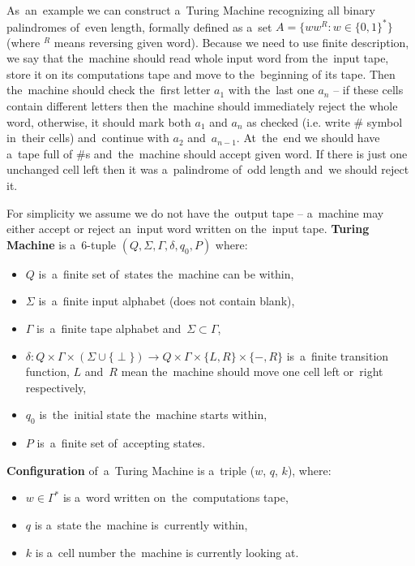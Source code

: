 \documentclass[english,shortabstract,mgr]{iithesis}
\begin{document}
As~an~example we can construct a~Turing Machine recognizing all binary palindromes of~even length,
formally defined as a~set $A = \{ ww^R : w \in \{0,1\}^* \}$ (where $^R$ means reversing given word).
Because we need to use finite description, we say that the~machine should read whole input word
from the~input tape, store it on its computations tape and move to the~beginning of its tape.
Then the~machine should check the~first letter $a_1$ with the~last one $a_n$ -- if these cells
contain different letters then the~machine should immediately reject the whole word,
otherwise, it should mark both $a_1$ and $a_n$ as checked (i.e. write $\#$ symbol in~their cells)
and~continue with $a_2$ and~$a_{n-1}$. At~the~end we should have a~tape full of $\#$s and~the~machine
should accept given word. If there is just one unchanged cell left then it was a~palindrome
of~odd length and~we should reject it.

For simplicity we assume we do not have the~output tape -- a~machine may either accept or reject
an~input word written on the~input tape. \textbf{Turing Machine} is a~$6$-tuple
$(Q,\Sigma,\Gamma,\delta,q_0,P)$ where:
\begin{itemize}
  \item $Q$ is~a~finite set of~states the~machine can be within,
  \item $\Sigma$ is~a~finite input alphabet (does not contain blank),
  \item $\Gamma$ is~a~finite tape alphabet and~$\Sigma \subset \Gamma$,
  \item $\delta: Q \times \Gamma \times \left( \Sigma \cup \{\perp\} \right)
      \rightarrow Q \times \Gamma \times \{L,R\} \times \{-,R\}$  is~a~finite
      transition function, $L$ and~$R$ mean the~machine should move one cell
      left or~right respectively,
  \item $q_0$ is~the~initial state the~machine starts within,
  \item $P$ is~a~finite set of~accepting states.
\end{itemize}

\textbf{Configuration} of~a~Turing Machine is a~triple ($w$, $q$, $k$), where:
\begin{itemize}
  \item $w \in \Gamma^*$ is a~word written on~the~computations tape,
  \item $q$ is a~state the~machine is~currently within,
  \item $k$ is a~cell number the~machine is currently looking at.
\end{itemize}
\end{document}
